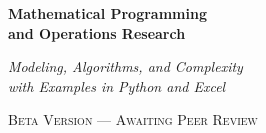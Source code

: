 
\begin{titlepage}
\thispagestyle{empty}
\begingroup
\pagecolor{white}
\centering

\vspace*{0.5in}

{\fontsize{30}{36}\selectfont\bfseries
  Mathematical Programming\\[2pt]
  and Operations Research\par}

\vspace{0.25in}

{\fontsize{14}{18}\selectfont\itshape
  Modeling, Algorithms, and Complexity\\
  with Examples in Python and Excel\par}

\vspace{0.2in}

{\fontsize{11}{14}\selectfont\scshape\color{chaptertitlecolour}
  Beta Version --- Awaiting Peer Review\par}

\vspace{0.3in}

\end{titlepage}
